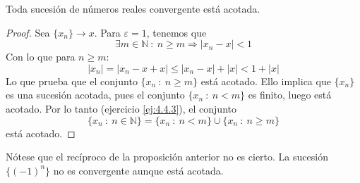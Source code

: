 \begin{prop}
    Toda sucesión de números reales convergente está acotada.
\end{prop}
\begin{proof}
    Sea $\{x_n\}\longrightarrow x$. Para $\varepsilon = 1$, tenemos que
    \begin{equation*}
        \exists m \in \mathbb{N}~:~ n \geq m \Longrightarrow  \left| x_n - x \right| < 1
    \end{equation*}
    Con lo que para $n \geq m$:
    \begin{equation*}
        \left| x_n \right| = \left| x_n - x + x\right| \leq \left| x_n - x \right| + \left| x \right| < 1+ \left| x \right|
    \end{equation*}
    Lo que prueba que el conjunto $\{x_n ~:~ n \geq m \}$ está acotado. Ello implica que $\{x_n\}$ es una sucesión acotada,
    pues el conjunto $\{x_n ~:~ n < m \}$ es finito, luego está acotado. Por lo tanto (ejercicio \ref{ej:4.4.3}), el conjunto
    \begin{equation*}
        \{x_n ~:~ n \in \mathbb{N} \} = \{x_n ~:~ n < m \} \cup \{x_n ~:~ n \geq m \}
    \end{equation*}
    está acotado.
\end{proof}

Nótese que el recíproco de la proposición anterior no es cierto. La sucesión $\{(-1)^n\}$ no es convergente aunque está acotada.



